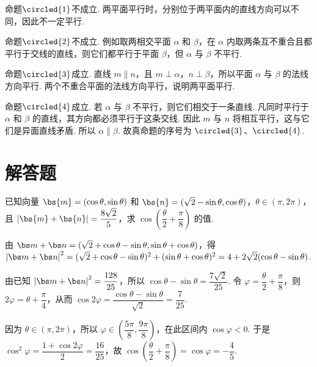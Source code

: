 
\begin{solution}
命题\(\circled{1}\)不成立. 两平面平行时，分别位于两平面内的直线方向可以不同，因此不一定平行.

命题\(\circled{2}\)不成立. 例如取两相交平面 \(\alpha\) 和 \(\beta\)，在 \(\alpha\) 内取两条互不重合且都平行于交线的直线，则它们都平行于平面 \(\beta\)，但 \(\alpha\) 与 \(\beta\) 不平行.

命题\(\circled{3}\)成立. 直线 \(m\parallel n\)，且 \(m\perp\alpha\)，\(n\perp\beta\)，所以平面 \(\alpha\) 与 \(\beta\) 的法线方向平行. 两个不重合平面的法线方向平行，说明两平面平行.

命题\(\circled{4}\)成立. 若 \(\alpha\) 与 \(\beta\) 不平行，则它们相交于一条直线. 凡同时平行于 \(\alpha\) 和 \(\beta\) 的直线，其方向都必须平行于这条交线. 因此 \(m\) 与 \(n\) 将相互平行，这与它们是异面直线矛盾. 所以 \(\alpha\parallel\beta\). 故真命题的序号为 \(\circled{3}\)、\(\circled{4}\).
\end{solution}

\section{解答题}
\begin{problem}
已知向量 \(\bs{m}=(\cos\theta,\sin\theta)\) 和 \(\bs{n}=(\sqrt{2}-\sin\theta,\cos\theta)\)，\(\theta\in(\pi,2\pi)\)，且 \(\left|\bs{m}+\bs{n}\right|=\dfrac{8\sqrt{2}}{5}\)，求 \(\cos\left(\dfrac{\theta}{2}+\dfrac{\pi}{8}\right)\) 的值.
\end{problem}

\begin{solution}
由
\(\bs m+\bs n=(\sqrt{2}+\cos\theta-\sin\theta,\sin\theta+\cos\theta)\)，得
\(\left|\bs m+\bs n\right|^2=(\sqrt{2}+\cos\theta-\sin\theta)^2+(\sin\theta+\cos\theta)^2=4+2\sqrt{2}(\cos\theta-\sin\theta)\).

由已知 \(\left|\bs m+\bs n\right|^2=\dfrac{128}{25}\)，所以
\(\cos\theta-\sin\theta=\dfrac{7\sqrt{2}}{25}\). 令 \(\varphi=\dfrac{\theta}{2}+\dfrac{\pi}{8}\)，则 \(2\varphi=\theta+\dfrac{\pi}{4}\)，从而
\(\cos 2\varphi=\dfrac{\cos\theta-\sin\theta}{\sqrt{2}}=\dfrac{7}{25}\).

因为 \(\theta\in(\pi,2\pi)\)，所以 \(\varphi\in\left(\dfrac{5\pi}{8},\dfrac{9\pi}{8}\right)\)，在此区间内 \(\cos\varphi<0\). 于是
\(\cos^2\varphi=\dfrac{1+\cos2\varphi}{2}=\dfrac{16}{25}\)，故
\(\cos\left(\dfrac{\theta}{2}+\dfrac{\pi}{8}\right)=\cos\varphi=-\dfrac{4}{5}\).
\end{solution}

